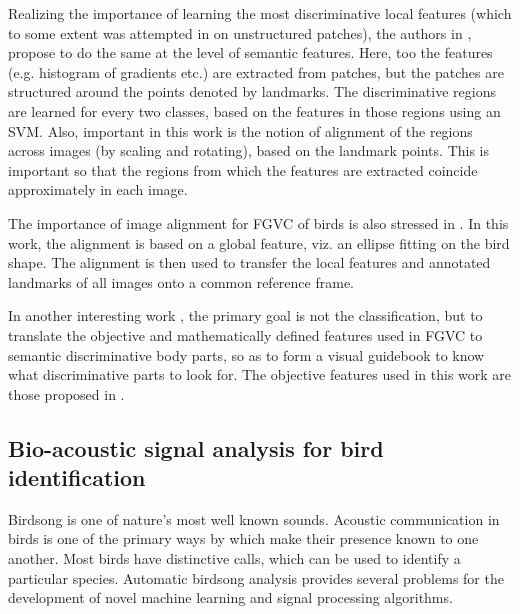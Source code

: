 \documentclass{article}
\begin{document}
Realizing the importance of learning the most discriminative local features
(which to some extent was attempted in \cite{hierarchy} on unstructured
patches), the authors in \cite{poof}, propose to do the same at the level of
semantic features. Here, too the features (e.g. histogram of gradients etc.) are
extracted from patches, but the patches are structured around the points denoted
by landmarks. The discriminative regions are learned for every two classes,
based on the features in those regions using an SVM. Also, important in this work is the notion of
alignment of the regions across images (by scaling and rotating), based on the
landmark points. This is important so that the regions from which the features
are extracted coincide approximately in each image. 

The importance of image alignment for FGVC of birds is also stressed in
\cite{align}. In this work, the alignment is based on a global feature, viz. an
ellipse fitting on the bird shape. The alignment is then used to transfer the
local features and annotated landmarks of all images onto a common reference
frame.  

In another interesting work \cite{crow}, the primary goal is not the
classification, but to translate the objective and mathematically defined
features used in FGVC to semantic discriminative body parts, so as to form a
visual guidebook to know what discriminative parts to look for. The objective
features used in this work are those proposed in \cite{poof}.
 
\subsection{Bio-acoustic signal analysis for bird identification}


Birdsong is one of nature's most well known sounds. Acoustic communication in
birds is one of the primary ways by which make their presence known to one
another. 
Most birds have
distinctive calls, which can be used to identify a particular species. Automatic
birdsong analysis provides several problems for the development of novel machine learning
and signal processing algorithms.
\end{document}
